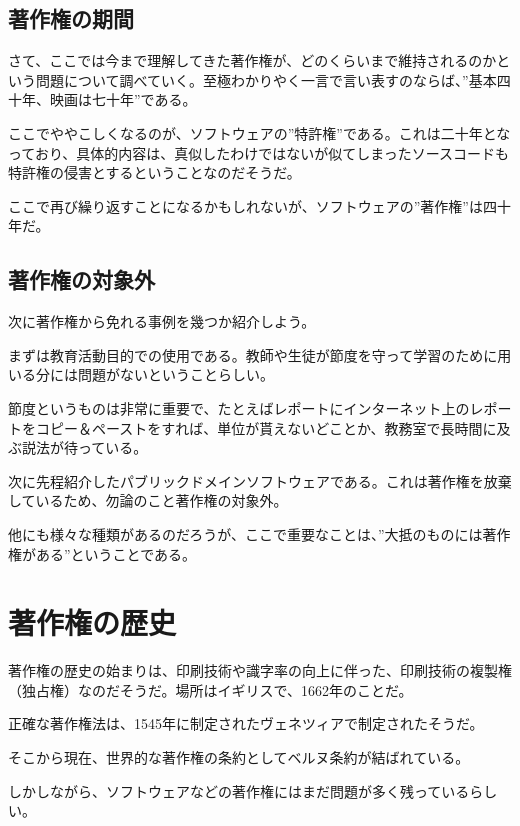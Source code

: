 \documentclass[a4j]{jsarticle}
\begin{document}
\subsection*{著作権の期間}
さて、ここでは今まで理解してきた著作権が、どのくらいまで維持されるのかという問題について調べていく。至極わかりやく一言で言い表すのならば、”基本四十年、映画は七十年”である。\cite{def_time} \par
ここでややこしくなるのが、ソフトウェアの”特許権”である。これは二十年となっており、具体的内容は、真似したわけではないが似てしまったソースコードも特許権の侵害とするということなのだそうだ。 \cite{def_tokkyo} \par
ここで再び繰り返すことになるかもしれないが、ソフトウェアの”著作権”は四十年だ。
\subsection*{著作権の対象外}
次に著作権から免れる事例を幾つか紹介しよう。 \par
まずは教育活動目的での使用である。教師や生徒が節度を守って学習のために用いる分には問題がないということらしい。\par
節度というものは非常に重要で、たとえばレポートにインターネット上のレポートをコピー＆ペーストをすれば、単位が貰えないどことか、教務室で長時間に及ぶ説法が待っている。\par
次に先程紹介したパブリックドメインソフトウェアである。これは著作権を放棄しているため、勿論のこと著作権の対象外。\par
他にも様々な種類があるのだろうが、ここで重要なことは、”大抵のものには著作権がある”ということである。
\section*{著作権の歴史}
著作権の歴史の始まりは、印刷技術や識字率の向上に伴った、印刷技術の複製権（独占権）なのだそうだ。場所はイギリスで、1662年のことだ。\par
正確な著作権法は、1545年に制定されたヴェネツィアで制定されたそうだ。 \par
そこから現在、世界的な著作権の条約としてベルヌ条約が結ばれている。\par
しかしながら、ソフトウェアなどの著作権にはまだ問題が多く残っているらしい。\cite{def_his} 
\end{document}
